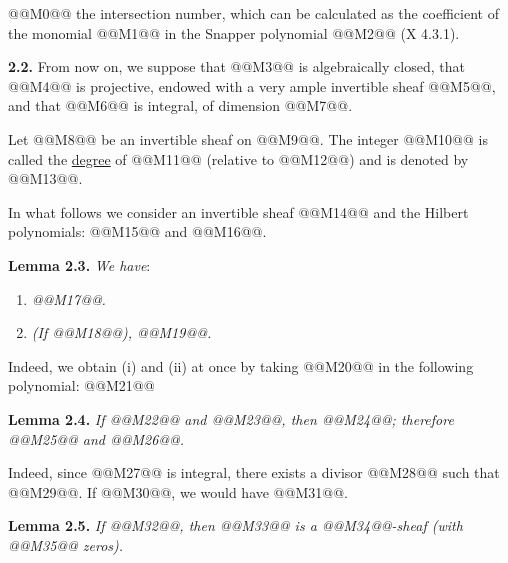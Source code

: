 @@M0@@ the intersection number, which can be calculated as the coefficient of the monomial @@M1@@ in the Snapper polynomial @@M2@@ (X 4.3.1).

\textbf{2.2.} From now on, we suppose that @@M3@@ is algebraically closed, that @@M4@@ is projective, endowed with a very ample invertible sheaf @@M5@@, and that @@M6@@ is integral, of dimension @@M7@@.

Let @@M8@@ be an invertible sheaf on @@M9@@. The integer @@M10@@ is called the \uline{degree} of @@M11@@ (relative to @@M12@@) and is denoted by @@M13@@.

In what follows we consider an invertible sheaf @@M14@@ and the Hilbert polynomials: @@M15@@ and @@M16@@.

\textbf{Lemma 2.3.} \emph{We have}:
\begin{enumerate}[label=(\roman*)]
\item \emph{@@M17@@.}
\item \emph{(If @@M18@@), @@M19@@.}
\end{enumerate}

Indeed, we obtain (i) and (ii) at once by taking @@M20@@ in the following polynomial:
@@M21@@

\textbf{Lemma 2.4.} \emph{If @@M22@@ and @@M23@@, then @@M24@@; therefore @@M25@@ and @@M26@@.}

Indeed, since @@M27@@ is integral, there exists a divisor @@M28@@ such that @@M29@@. If @@M30@@, we would have @@M31@@.

\textbf{Lemma 2.5.} \emph{If @@M32@@, then @@M33@@ is a @@M34@@-sheaf (with @@M35@@ zeros).}

